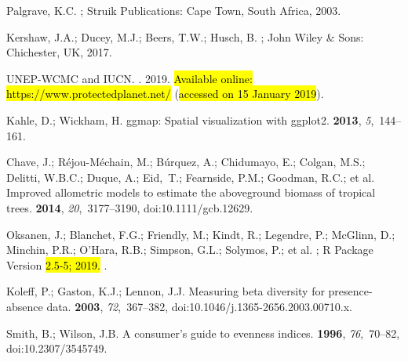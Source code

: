 \documentclass[diversity,article,accept,moreauthors,pdftex]{Definitions/mdpi}
\begin{document}
\begin{thebibliography}{999}
Palgrave, K.C.
; Struik Publications: Cape Town,
  South Africa,  2003.

Kershaw, J.A.; Ducey, M.J.; Beers, T.W.; Husch, B.
; John Wiley \& Sons: Chichester, UK,  2017.

{UNEP-WCMC and IUCN}.
.
   2019. \hl{Available online: https://www.protectedplanet.net/} %
(\hl{accessed on 15 January 2019}). %

Kahle, D.; Wickham, H.
\newblock ggmap: {Spatial} visualization with ggplot2.
 {\bf 2013}, {\em 5},~144--161.

Chave, J.; R{\'{e}}jou-M{\'{e}}chain, M.; B{\'{u}}rquez, A.; Chidumayo, E.;
  Colgan, M.S.; Delitti, W.B.C.; Duque, A.; Eid,~T.; Fearnside, P.M.; Goodman,
  R.C.; et al.
\newblock Improved allometric models to estimate the aboveground biomass of
  tropical trees.
 {\bf 2014}, {\em 20},~3177--3190, doi:10.1111/gcb.12629.

Oksanen, J.; Blanchet, F.G.; Friendly, M.; Kindt, R.; Legendre, P.; {McGlinn},
  D.; Minchin, P.R.; O'Hara, R.B.; Simpson, G.L.; Solymos, P.; et al.
; R Package Version \hl{2.5-5;  2019.} %
\newblock .

Koleff, P.; Gaston, K.J.; Lennon, J.J.
\newblock Measuring beta diversity for presence-absence data.
 {\bf 2003}, {\em 72},~367--382, doi:10.1046/j.1365-2656.2003.00710.x.

Smith, B.; Wilson, J.B.
\newblock A consumer's guide to evenness indices.
 {\bf 1996}, {\em 76},~70--82, doi:10.2307/3545749.


\end{thebibliography}
\end{document}
